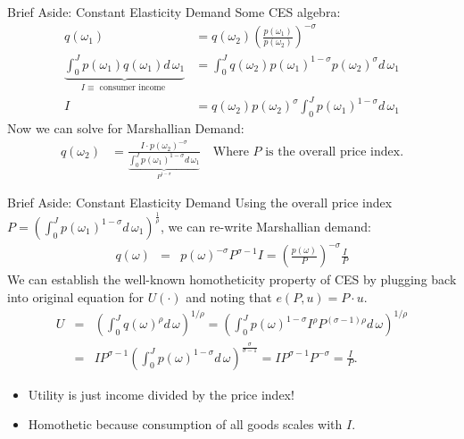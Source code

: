 \begin{frame}{Brief Aside: Constant Elasticity Demand}
\small
Some CES algebra:
\begin{align*}
q(\omega_1) &= q(\omega_2) \left( \frac{p(\omega_1)}{p(\omega_2)} \right)^{-\sigma}\\
\underbrace{\int_{0}^J p(\omega_1) q(\omega_1)  d\, \omega_1}_{I \equiv \text{ consumer income }} &= \int_{0}^J q(\omega_2) p(\omega_1)^{1-\sigma} p(\omega_2)^{\sigma} d\, \omega_1\\
I &= q(\omega_2) p(\omega_2)^{\sigma}  \int_{0}^J  p(\omega_1)^{1-\sigma}  d\, \omega_1
\end{align*}
Now we can solve for Marshallian Demand:
\begin{align*}
q(\omega_2) &= \frac{I  \cdot p(\omega_2)^{-\sigma}}{\underbrace{\int_{0}^J  p(\omega_1)^{1-\sigma}  d\, \omega_1}_{P^{1-\sigma}}} \quad \text{Where $P$ is the overall price index}.
\end{align*}

\end{frame}

\begin{frame}{Brief Aside: Constant Elasticity Demand}
Using the overall price index $P =\left( \int_{0}^J  p(\omega_1)^{1-\sigma}  d\, \omega_1 \right)^{\frac{1}{\rho}}$, we can re-write Marshallian demand:
\begin{eqnarray*}
q(\omega) &=& p(\omega)^{-\sigma} P^{\sigma-1} I = \left(\frac{p(\omega)}{P}\right)^{-\sigma}  \frac{I}{P}
\end{eqnarray*}
We can establish the well-known \alert{homotheticity} property of CES by plugging back into original equation for $U(\cdot)$ and noting that $e(P,u) = P \cdot u$.
\begin{eqnarray*}
U &=&\left( \int_0^J q(\omega)^\rho d\, \omega \right)^{1/\rho}  =  \left( \int_0^J  p(\omega)^{1-\sigma} I^{\rho} P^{(\sigma-1) \rho} d\, \omega \right)^{1/\rho} \\
 &=& IP^{\sigma-1}\left( \int_0^J  p(\omega)^{1-\sigma} d\, \omega \right)^{\frac{\sigma}{\sigma-1}}  = IP^{\sigma-1} P^{-\sigma}  = \frac{I}{P}.
\end{eqnarray*}
\begin{itemize}
\item Utility is just income divided by the price index!
\item Homothetic because consumption of all goods scales with $I$.
\end{itemize}
\end{frame}




